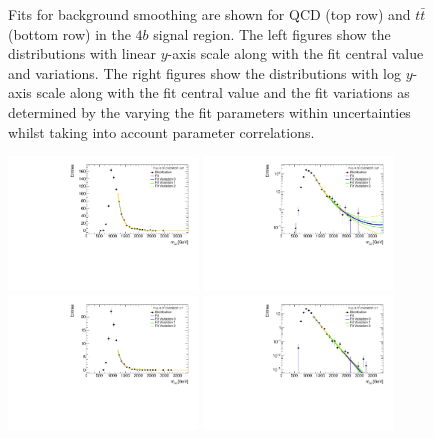\begin{figure}[htbp!]
\begin{center}
\caption{Fits for background smoothing are shown for QCD (top row) and $t\bar{t}$ (bottom row) in the $4b$ signal region.  The left figures show the distributions with linear $y$-axis scale along with the fit central value and variations. The right figures show the  distributions with log $y$-axis scale along with the fit central value and the fit variations as determined by the varying the fit parameters within uncertainties whilst taking into account parameter correlations. }
\label{fig:signal-region-4b-smoothing}
\end{center}
\end{figure}

\begin{figure}[htbp!]
\begin{center}
\includegraphics[width=0.45\textwidth,angle=-90]{figures/boosted/Smooth/qcd_est_ThreeTag_Signal_mHH_l.pdf}
\includegraphics[width=0.45\textwidth,angle=-90]{figures/boosted/Smooth/qcd_est_ThreeTag_Signal_mHH_l_l.pdf}\\  
\includegraphics[width=0.45\textwidth,angle=-90]{figures/boosted/Smooth/ttbar_est_ThreeTag_Signal_mHH_l.pdf}
\includegraphics[width=0.45\textwidth,angle=-90]{figures/boosted/Smooth/ttbar_est_ThreeTag_Signal_mHH_l_l.pdf}\\

\end{center}
\end{figure}
